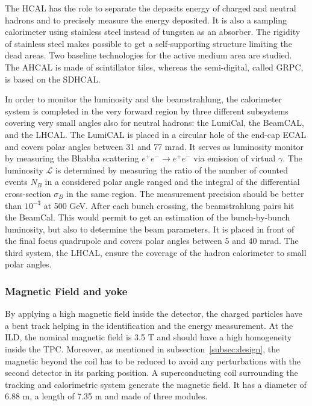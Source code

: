       The \gls{HCAL} has the role to separate the deposits energy of charged and neutral hadrons and to precisely measure the energy deposited.
      It is also a sampling calorimeter using stainless steel instead of tungsten as an absorber. 
      The rigidity of stainless steel makes possible to get a self-supporting structure limiting the dead areas.
      Two baseline technologies for the active medium area are studied.
      The  \gls{AHCAL} is made of scintillator tiles, whereas the semi-digital, called \gls{GRPC}, is based on the \gls{SDHCAL}.

      In order to monitor the luminosity and the beamstrahlung, the calorimeter system is completed in the very forward region by three different subsystems covering very small angles also for neutral hadrons: the LumiCal, the BeamCAL, and the \gls{LHCAL}.
      The LumiCAL is placed in a circular hole of the end-cap \gls{ECAL} and covers polar angles between 31 and 77 mrad. 
      It serves as luminosity monitor by measuring the Bhabha scattering $e^+e^- \rightarrow e^+e^-$ via emission of virtual $\gamma$.
      The luminosity $\mathcal{L}$ is determined by measuring  the ratio of the number of counted events $N_B$ in a considered polar angle ranged and the integral of the differential cross-section $\sigma_B$ in the same region.
      The measurement precision should be better than $10^{-3}$ at 500 GeV.
      After each bunch crossing, the beamstrahlung pairs hit the BeamCal.
      This would permit to get an estimation of the bunch-by-bunch luminosity, but also to determine the beam parameters.
      It is placed in front of the final focus quadrupole and covers polar angles between 5 and 40 mrad.
      The third system, the \gls{LHCAL}, ensure the coverage of the hadron calorimeter to small polar angles. 

      \subsubsection{Magnetic Field and yoke}

     By applying a high magnetic field inside the detector, the charged particles have a bent track helping in the identification and the energy measurement.
     At the \gls{ILD}, the nominal magnetic field is 3.5 T and should have a high homogeneity inside the TPC.
     Moreover, as mentioned in subsection~\ref{subsec:design}, the magnetic beyond the coil has to be reduced to avoid any perturbations with the second detector in its parking position.
     A superconducting coil surrounding the tracking and calorimetric system generate the magnetic field.
     It has a diameter of 6.88 m, a length of 7.35 m and made of three modules.

